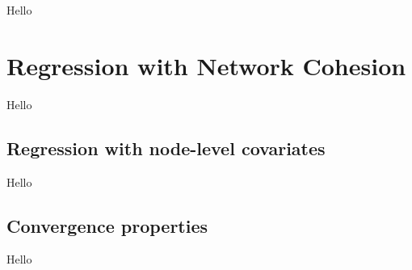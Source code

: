 Hello


\section{Regression with Network Cohesion}

\label{sec:rnc_mdp}

Hello

\subsection{Regression with node-level covariates}

Hello

\subsection{Convergence properties}

Hello





